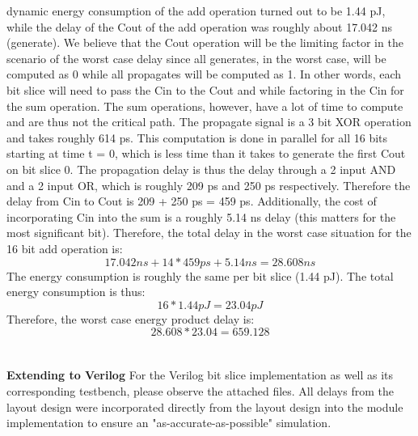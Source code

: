 \documentclass[12pt]{article}
\begin{document}
  dynamic energy consumption of the add operation turned out to be 1.44 pJ, while the delay of the Cout of the 
  add operation was roughly about 17.042 ns (generate). We believe that the Cout operation will be the 
  limiting factor in the scenario of the worst case delay since all generates, in the worst case, will be computed 
  as 0 while all propagates will be computed as 1. In other words, each bit slice will need to pass the Cin to the Cout
  and while factoring in the Cin for the sum operation. The sum operations, however, have a lot of time to compute
  and are thus not the critical path. The propagate signal is a 3 bit XOR operation and takes roughly 614 ps. This
  computation is done in parallel for all 16 bits starting at time t = 0, which is less time than it takes to generate
  the first Cout on bit slice 0. The propagation delay is thus the delay through a 2 input AND and a 2 input OR, 
  which is roughly 209 ps and 250 ps respectively. Therefore the delay from Cin to Cout is 209 + 250 ps = 459 ps. 
  Additionally, the cost of incorporating Cin into the sum is a roughly 5.14 ns delay (this matters for the most 
  significant bit). Therefore, the total delay in the worst case situation for the 16 bit add operation is:
  \newline
  \[17.042 ns + 14*459 ps + 5.14 ns = 28.608 ns\]
  \newline
  The energy consumption is roughly the same per bit slice (1.44 pJ). The total energy consumption is thus:
  \newline
  \[16*1.44 pJ = 23.04 pJ\]
  \newline
  Therefore, the worst case energy product delay is:
  \newline
  \[28.608 * 23.04 = \boxed{659.128}\]
  
 \section{}
 
 \textbf{Extending to Verilog}
 \newline \newline
 For the Verilog bit slice implementation as well as its corresponding testbench, please observe the attached files.
 All delays from the layout design were incorporated directly from the layout design into the module implementation
 to ensure an "as-accurate-as-possible" simulation.
 
  \section{}
 
\end{document}
